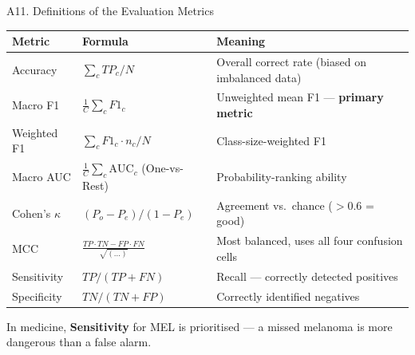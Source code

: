 \documentclass[10pt, aspectratio=169]{beamer}
\begin{document}
\begin{frame}{A11. Definitions of the Evaluation Metrics}
    \scriptsize
    \begin{table}[]
        \centering
        \begin{tabular}{lll}
        \toprule
        \rowcolor{usthblue!25} \textbf{Metric} & \textbf{Formula} & \textbf{Meaning} \\
        \midrule
        Accuracy        & $\sum_c TP_c / N$                                  & Overall correct rate (biased on imbalanced data) \\
        Macro F1        & $\frac{1}{C}\sum_c F1_c$                           & Unweighted mean F1 --- \textbf{primary metric} \\
        Weighted F1     & $\sum_c F1_c \cdot n_c / N$                        & Class-size-weighted F1 \\
        Macro AUC       & $\frac{1}{C}\sum_c \mathrm{AUC}_c$ (One-vs-Rest)   & Probability-ranking ability \\
        Cohen's $\kappa$ & $(P_o - P_e)/(1 - P_e)$                           & Agreement vs.\ chance ($>$0.6 = good) \\
        MCC             & $\frac{TP\cdot TN - FP\cdot FN}{\sqrt{(\dots)}}$   & Most balanced, uses all four confusion cells \\
        Sensitivity     & $TP/(TP+FN)$                                       & Recall --- correctly detected positives \\
        Specificity     & $TN/(TN+FP)$                                       & Correctly identified negatives \\
        \bottomrule
        \end{tabular}
    \end{table}

    \vspace{0.2cm}
    In medicine, \textbf{Sensitivity} for MEL is prioritised --- a missed melanoma is more dangerous than a false alarm.
\end{frame}
\end{document}
